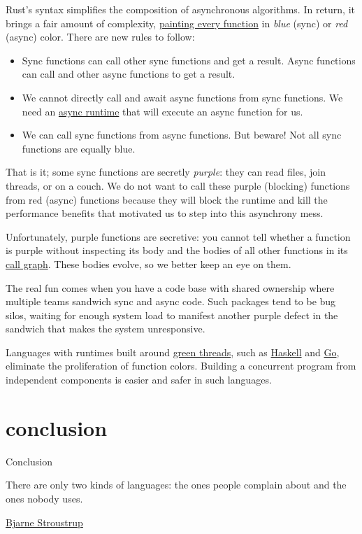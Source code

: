 \documentclass{article}
\begin{document}
Rust's  syntax simplifies the composition of asynchronous algorithms.
In return, it brings a fair amount of complexity, \href{https://journal.stuffwithstuff.com/2015/02/01/what-color-is-your-function/}{painting every function} in \emph{blue} (sync) or \emph{red} (async) color.
There are new rules to follow:
\begin{itemize}
  \item
    Sync functions can call other sync functions and get a result.
    Async functions can call and  other async functions to get a result.
  \item
    We cannot directly call and await async functions from sync functions.
    We need an \href{#implicit-async-runtimes}{async runtime} that will execute an async function for us.
  \item
    We can call sync functions from async functions.
    But beware!
    Not all sync functions are equally blue.
\end{itemize}

That is it; some sync functions are secretly \emph{purple}: they can read files, join threads, or \href{https://doc.rust-lang.org/std/thread/fn.sleep.html}{} on a couch.
We do not want to call these purple (blocking) functions from red (async) functions because they will block the runtime and kill the performance benefits that motivated us to step into this asynchrony mess.

Unfortunately, purple functions are secretive: you cannot tell whether a function is purple without inspecting its body and the bodies of all other functions in its \href{https://en.wikipedia.org/wiki/Call_graph}{call graph}.
These bodies evolve, so we better keep an eye on them.

The real fun comes when you have a code base with shared ownership where multiple teams sandwich sync and async code.
Such packages tend to be bug silos, waiting for enough system load to manifest another purple defect in the sandwich that makes the system unresponsive.

Languages with runtimes built around \href{https://en.wikipedia.org/wiki/Green_thread}{green threads}, such as \href{https://haskell.org/}{Haskell} and \href{https://go.dev/}{Go}, eliminate the proliferation of function colors.
Building a concurrent program from independent components is easier and safer in such languages.

\section{conclusion}{Conclusion}
\epigraph{
    There are only two kinds of languages: the ones people complain about and the ones nobody uses.
}{\href{https://www.stroustrup.com/quotes.html}{Bjarne Stroustrup}}
\end{document}
